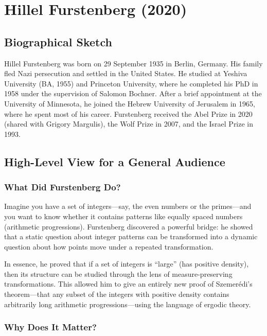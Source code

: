 \chapter{Hillel Furstenberg (2020)}

\section{Biographical Sketch}

Hillel Furstenberg was born on 29 September 1935 in Berlin, Germany. His family fled Nazi persecution and settled in the United States. He studied at Yeshiva University (BA, 1955) and Princeton University, where he completed his PhD in 1958 under the supervision of Salomon Bochner. After a brief appointment at the University of Minnesota, he joined the Hebrew University of Jerusalem in 1965, where he spent most of his career. Furstenberg received the Abel Prize in 2020 (shared with Grigory Margulis), the Wolf Prize in 2007, and the Israel Prize in 1993.

\section{High-Level View for a General Audience}

\subsection{What Did Furstenberg Do?}

Imagine you have a set of integers---say, the even numbers or the primes---and you want to know whether it contains patterns like equally spaced numbers (arithmetic progressions). Furstenberg discovered a powerful bridge: he showed that a static question about integer patterns can be transformed into a dynamic question about how points move under a repeated transformation.

In essence, he proved that if a set of integers is ``large'' (has positive density), then its structure can be studied through the lens of measure-preserving transformations. This allowed him to give an entirely new proof of Szemer\'edi's theorem---that any subset of the integers with positive density contains arbitrarily long arithmetic progressions---using the language of ergodic theory.

\subsection{Why Does It Matter?}

